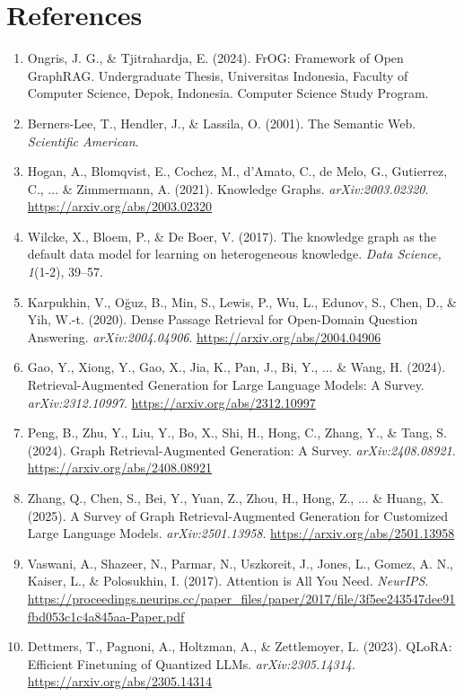 \documentclass[12pt,a4paper,onecolumn]{article}
\begin{document}
\section*{References}
\begingroup\small
\begin{enumerate}
  \item Ongris, J. G., \& Tjitrahardja, E. (2024). FrOG: Framework of Open GraphRAG. Undergraduate Thesis, Universitas Indonesia, Faculty of Computer Science, Depok, Indonesia. Computer Science Study Program.
  \item Berners-Lee, T., Hendler, J., \& Lassila, O. (2001). The Semantic Web. \textit{Scientific American}. 
  \item Hogan, A., Blomqvist, E., Cochez, M., d'Amato, C., de Melo, G., Gutierrez, C., ... \& Zimmermann, A. (2021). Knowledge Graphs. \textit{arXiv:2003.02320}. \url{https://arxiv.org/abs/2003.02320}
  \item Wilcke, X., Bloem, P., \& De Boer, V. (2017). The knowledge graph as the default data model for learning on heterogeneous knowledge. \textit{Data Science, 1}(1-2), 39--57.
  \item Karpukhin, V., Oğuz, B., Min, S., Lewis, P., Wu, L., Edunov, S., Chen, D., \& Yih, W.-t. (2020). Dense Passage Retrieval for Open-Domain Question Answering. \textit{arXiv:2004.04906}. \url{https://arxiv.org/abs/2004.04906}
  \item Gao, Y., Xiong, Y., Gao, X., Jia, K., Pan, J., Bi, Y., ... \& Wang, H. (2024). Retrieval-Augmented Generation for Large Language Models: A Survey. \textit{arXiv:2312.10997}. \url{https://arxiv.org/abs/2312.10997}
  \item Peng, B., Zhu, Y., Liu, Y., Bo, X., Shi, H., Hong, C., Zhang, Y., \& Tang, S. (2024). Graph Retrieval-Augmented Generation: A Survey. \textit{arXiv:2408.08921}. \url{https://arxiv.org/abs/2408.08921}
  \item Zhang, Q., Chen, S., Bei, Y., Yuan, Z., Zhou, H., Hong, Z., ... \& Huang, X. (2025). A Survey of Graph Retrieval-Augmented Generation for Customized Large Language Models. \textit{arXiv:2501.13958}. \url{https://arxiv.org/abs/2501.13958}
  \item Vaswani, A., Shazeer, N., Parmar, N., Uszkoreit, J., Jones, L., Gomez, A. N., Kaiser, L., \& Polosukhin, I. (2017). Attention is All You Need. \textit{NeurIPS}. \url{https://proceedings.neurips.cc/paper_files/paper/2017/file/3f5ee243547dee91fbd053c1c4a845aa-Paper.pdf}
  \item Dettmers, T., Pagnoni, A., Holtzman, A., \& Zettlemoyer, L. (2023). QLoRA: Efficient Finetuning of Quantized LLMs. \textit{arXiv:2305.14314}. \url{https://arxiv.org/abs/2305.14314}

\end{enumerate}
\end{document}

